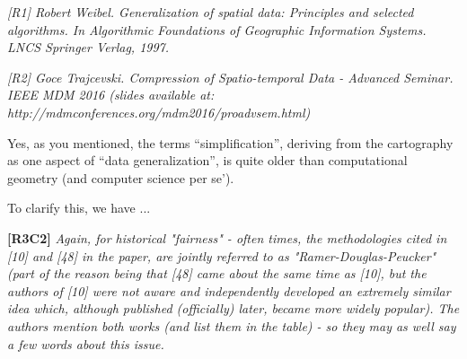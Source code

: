 \documentclass{letter}
\begin{document}
\emph{[R1] Robert Weibel. Generalization of spatial data: Principles and selected algorithms. In Algorithmic Foundations of Geographic Information Systems. LNCS Springer Verlag, 1997.}


\emph{[R2] Goce Trajcevski. Compression of Spatio-temporal Data - Advanced Seminar. IEEE MDM 2016 (slides available at: http://mdmconferences.org/mdm2016/proadvsem.html)}





Yes, as you mentioned, the terms ``simplification'', deriving from the cartography as one aspect of ``data generalization'', is quite older than computational geometry (and computer science per se'). 

To clarify this, we have ...


\textbf{[R3C2]} \emph{Again, for historical "fairness" - often times, the methodologies cited in [10] and [48] in the paper, are jointly referred to as "Ramer-Douglas-Peucker" (part of the reason being that [48] came about the same time as [10], but the authors of [10] were not aware and independently developed an extremely similar idea which, although published (officially) later, became more widely popular). The authors mention both works (and list them in the table) - so they may as well say a few words about this issue.}
\end{document}
